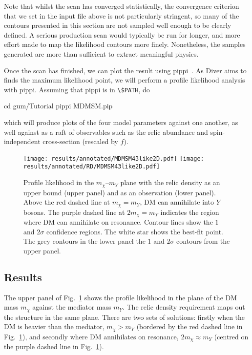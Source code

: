 \documentclass[pdftex,twocolumn,epjc3_preprint,runningheads]{svjour3}
\renewcommand{\_}{\discretionary{\underscore}{}{\underscore}}
\newcommand\term[1]{{\lstset{style=terminal}\lstinline!#1!\lstset{style=cpp}}}
\newcommand\pippi{\textsf{pippi}\xspace}
\newcommand\diver{\textsf{Diver}\xspace}
\begin{document}
Note that whilst the scan has converged statistically, the convergence criterion that we set in the input file above is not particularly stringent, so many of the contours presented in this section are not sampled well enough to be clearly defined. A serious production scan would typically be run for longer, and more effort made to map the likelihood contours more finely. Nonetheless, the samples generated are more than sufficient to extract meaningful physics.

Once the scan has finished, we can plot the result using \pippi~\cite{pippi}. As \diver aims to finds the maximum likelihood point, we will perform a profile likelihood analysis with \pippi. Assuming that \pippi is in \term{\$PATH}, do
%
\begin{lstterm}
cd gum/Tutorial
pippi MDMSM.pip
\end{lstterm}
%
which will produce plots of the four model parameters against one another, as well against as a raft of observables such as the relic abundance and spin-independent cross-section (rescaled by $f$).

\begin{figure}[tpb]
  \centering
  \texttt{[image: results/annotated/MDMSM\_4\_3\_like2D.pdf]}
  \texttt{[image: results/annotated/RD/MDMSM\_4\_3\_like2D.pdf]}
  \vspace{-2mm}
  \caption{Profile likelihood in the $m_\chi$--$m_Y$ plane with the relic density as an upper bound (upper panel) and as an observation (lower panel).   Above the red dashed line at $m_\chi=m_Y$, DM can annihilate into $Y$ bosons.  The purple dashed line at $2m_\chi=m_Y$ indicates the region where DM can annihilate on resonance.  Contour lines show the $1$ and $2\sigma$ confidence regions. The white star shows the best-fit point. The grey contours in the lower panel the $1$ and $2\sigma$ contours from the upper panel.}
  \label{fig::mchi_vs_mY}
\end{figure}

\subsection{Results}

The upper panel of Fig.~\ref{fig::mchi_vs_mY} shows the profile likelihood in the plane of the DM mass $m_\chi$ against the mediator mass $m_Y$. The relic density requirement maps out the structure in the same plane.  There are two sets of solutions: firstly when the DM is heavier than the mediator, $m_\chi > m_Y$ (bordered by the red dashed line in Fig.~\ref{fig::mchi_vs_mY}), and secondly where DM annihilates on resonance, $2m_\chi \approx m_Y$ (centred on the purple dashed line in Fig.~\ref{fig::mchi_vs_mY}).
\end{document}
